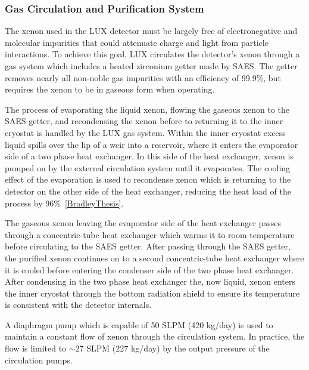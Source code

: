 \subsubsection{Gas Circulation and Purification System} \label{GasSystem}
The xenon used in the LUX detector must be largely free of electronegative and molecular impurities that could attenuate charge and light from particle interactions.  To achieve this goal, LUX circulates the detector’s xenon through a gas system which includes a heated zirconium getter made by SAES.  The getter removes nearly all non-noble gas impurities with an efficiency of 99.9\%, but requires the xenon to be in gaseous form when operating.  

The process of evaporating the liquid xenon, flowing the gaseous xenon to the SAES getter, and recondensing the xenon before to returning it to the inner cryostat is handled by the LUX gas system. Within the inner cryostat excess liquid spills over the lip of a weir into a reservoir, where it enters the evaporator side of a two phase heat exchanger.  In this side of the heat exchanger, xenon is pumped on by the external circulation system until it evaporates. The cooling effect of the evaporation is used to recondense xenon which is returning to the detector on the other side of the heat exchanger, reducing the heat load of the process by 96\%~\ref{BradleyThesis}.


The gaseous xenon leaving the evaporator side of the heat exchanger passes through a concentric-tube heat exchanger which warms it to room temperature before circulating to the SAES getter.  After passing through the SAES getter, the purified xenon continues on to a second concentric-tube heat exchanger where it is cooled before entering the condenser side of the two phase heat exchanger.  After condensing in the two phase heat exchanger the, now liquid, xenon enters the inner cryostat through the bottom radiation shield to ensure its temperature is consistent with the detector internals.

A diaphragm pump which is capable of 50 SLPM (420 kg/day) is used to maintain a constant flow of xenon through the circulation system.  In practice, the flow is limited to $\sim$27 SLPM (227 kg/day) by the output pressure of the circulation pumps. 

